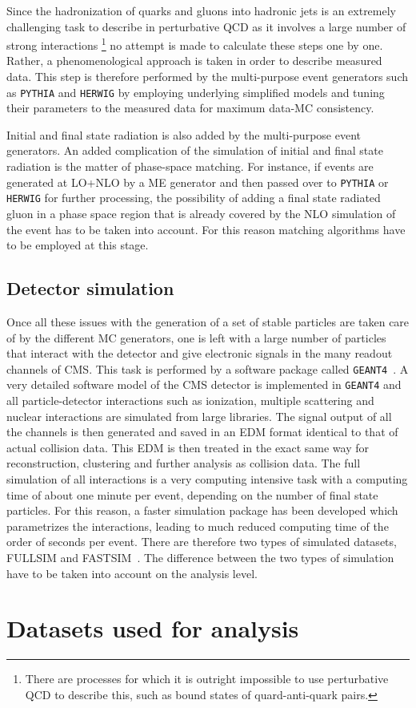 Since the hadronization of quarks and gluons into hadronic jets is an extremely challenging task to describe
in perturbative QCD as it involves a large number of strong interactions
\footnote{There are processes for which it is outright impossible to use perturbative QCD to describe this, such as bound states of quard-anti-quark pairs.} 
no attempt is made to calculate these steps one by one. Rather, a phenomenological
approach is taken in order to describe measured data. This step is therefore performed by the multi-purpose event generators such as \texttt{PYTHIA} and \texttt{HERWIG} by 
employing underlying simplified models and tuning their parameters to the measured data for maximum data-MC consistency. 

Initial and final state radiation is also added by the multi-purpose event generators. An added complication of the simulation of initial and final state radiation is the matter
of phase-space matching. For instance, if events are generated at LO+NLO by a ME generator and then passed over to \texttt{PYTHIA} or \texttt{HERWIG} for further processing, the possibility of
adding a final state radiated gluon in a phase space region that is already covered by the NLO simulation of the event has to be taken into account. For this reason matching algorithms
have to be employed at this stage.


\subsection{Detector simulation}
\label{sub:geant}
Once all these issues with the generation of a set of stable particles are taken care of by the different MC generators, one is left with a large number 
of particles that interact with the detector and give electronic signals in the many readout channels of CMS. This task is performed by a software package called
\texttt{GEANT4}~\cite{geant4}. A very detailed software model of the CMS detector is implemented in \texttt{GEANT4} and all particle-detector interactions
such as ionization, multiple scattering and nuclear interactions are simulated from large libraries. The signal output of all the channels is then generated
and saved in an EDM format identical to that of actual collision data. This EDM is then treated in the exact same way for reconstruction, clustering and further analysis
as collision data. The full simulation of all interactions is a very computing intensive task with a computing time of about one minute per event, depending on the number
of final state particles. For this reason, a faster simulation package has been developed which parametrizes the interactions, leading to much reduced computing time 
of the order of seconds per event. There are therefore two types of simulated datasets, FULLSIM and FASTSIM~\cite{fastsim}. The difference between the two types of simulation
have to be taken into account on the analysis level.

\section{Datasets used for analysis}
\label{sec:datasets}

